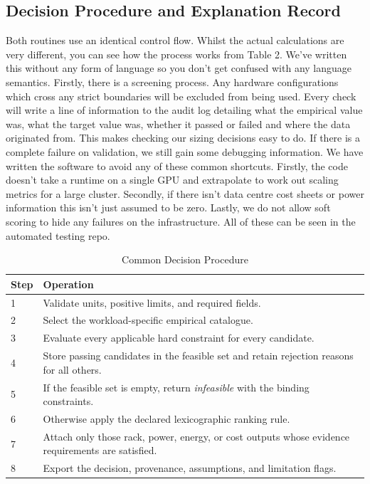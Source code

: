 \documentclass[final,3p,12pt,nopreprintline]{elsarticle}
\begin{document}
\subsection{Decision Procedure and Explanation Record}


Both routines use an identical control flow. Whilst the actual calculations are very different, you can see how the process works from Table 2. We’ve written this without any form of language so you don’t get confused with any language semantics. Firstly, there is a screening process. Any hardware configurations which cross any strict boundaries will be excluded from being used. Every check will write a line of information to the audit log detailing what the empirical value was, what the target value was, whether it passed or failed and where the data originated from. This makes checking our sizing decisions easy to do. If there is a complete failure on validation, we still gain some debugging information. We have written the software to avoid any of these common shortcuts. Firstly, the code doesn’t take a runtime on a single GPU and extrapolate to work out scaling metrics for a large cluster. Secondly, if there isn’t data centre cost sheets or power information this isn’t just assumed to be zero. Lastly, we do not allow soft scoring to hide any failures on the infrastructure. All of these can be seen in the automated testing repo.


\begin{table}[htbp]
\caption{Common Decision Procedure}
\label{tab:procedure}
\centering
\footnotesize
\setlength{\tabcolsep}{3pt}
\renewcommand{\arraystretch}{1.08}
\begin{tabularx}{\columnwidth}{p{1.0cm}X}
\toprule
\textbf{Step} & \textbf{Operation}\\
\midrule
1 & Validate units, positive limits, and required fields.\\
2 & Select the workload-specific empirical catalogue.\\
3 & Evaluate every applicable hard constraint for every candidate.\\
4 & Store passing candidates in the feasible set and retain rejection reasons for all others.\\
5 & If the feasible set is empty, return \emph{infeasible} with the binding constraints.\\
6 & Otherwise apply the declared lexicographic ranking rule.\\
7 & Attach only those rack, power, energy, or cost outputs whose evidence requirements are satisfied.\\
8 & Export the decision, provenance, assumptions, and limitation flags.\\
\bottomrule
\end{tabularx}
\end{table}
\end{document}
